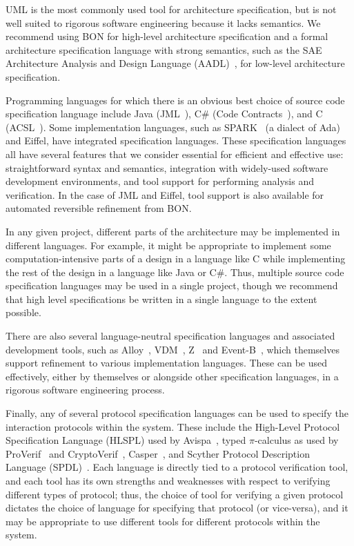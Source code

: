 UML is the most commonly used tool for architecture specification, but
is not well suited to rigorous software engineering because it lacks
semantics. We recommend using BON for high-level architecture
specification and a formal architecture specification language with
strong semantics, such as the SAE Architecture Analysis and Design
Language (AADL)~\cite{AADL}, for low-level architecture
specification. 


Programming languages for which there is an obvious best choice of
source code specification language include Java
(JML~\cite{JMLReferenceManual}), C\# (Code
Contracts~\cite{CodeContracts}), and C (ACSL~\cite{ACSL}). Some
implementation languages, such as SPARK~\cite{SPARK2014} (a dialect of
Ada) and Eiffel, have integrated specification languages. These
specification languages all have several features that we consider
essential for efficient and effective use: straightforward syntax and
semantics, integration with widely-used software development
environments, and tool support for performing analysis and
verification. In the case of JML and Eiffel, tool support is also
available for automated reversible refinement from BON.

In any given project, different parts of the architecture may be
implemented in different languages. For example, it might be
appropriate to implement some computation-intensive parts of a design
in a language like C while implementing the rest of the design in a
language like Java or C\#. Thus, multiple source code specification
languages may be used in a single project, though we recommend that
high level specifications be written in a single language to the
extent possible.

There are also several language-neutral specification languages and
associated development tools, such as Alloy~\cite{Alloy},
VDM~\cite{VDM}, Z~\cite{Zed} and Event-B~\cite{Abrial10}, which
themselves support refinement to various implementation
languages. These can be used effectively, either by themselves or
alongside other specification languages, in a rigorous software
engineering process. 


Finally, any of several protocol specification languages can be used
to specify the interaction protocols within the system. These include
the High-Level Protocol Specification Language (HLSPL) used by
Avispa~\cite{Avispa}, typed $\pi$-calculus as used by
ProVerif~\cite{ProVerif} and CryptoVerif~\cite{CryptoVerif},
Casper~\cite{Casper}, and Scyther Protocol Description Language
(SPDL)~\cite{Scyther}. Each language is directly tied to a protocol
verification tool, and each tool has its own strengths and weaknesses
with respect to verifying different types of protocol; thus, the
choice of tool for verifying a given protocol dictates the choice of
language for specifying that protocol (or vice-versa), and it may be
appropriate to use different tools for different protocols within the
system.

